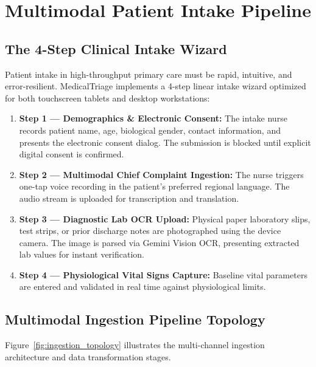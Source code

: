 \documentclass[11pt,a4paper,oneside]{report}
\begin{document}
\chapter{Multimodal Patient Intake Pipeline}

\section{The 4-Step Clinical Intake Wizard}
Patient intake in high-throughput primary care must be rapid, intuitive, and error-resilient. MedicalTriage implements a 4-step linear intake wizard optimized for both touchscreen tablets and desktop workstations:
\begin{enumerate}[leftmargin=20pt]
  \item \textbf{Step 1 --- Demographics \& Electronic Consent:} The intake nurse records patient name, age, biological gender, contact information, and presents the electronic consent dialog. The submission is blocked until explicit digital consent is confirmed.
  \item \textbf{Step 2 --- Multimodal Chief Complaint Ingestion:} The nurse triggers one-tap voice recording in the patient's preferred regional language. The audio stream is uploaded for transcription and translation.
  \item \textbf{Step 3 --- Diagnostic Lab OCR Upload:} Physical paper laboratory slips, test strips, or prior discharge notes are photographed using the device camera. The image is parsed via Gemini Vision OCR, presenting extracted lab values for instant verification.
  \item \textbf{Step 4 --- Physiological Vital Signs Capture:} Baseline vital parameters are entered and validated in real time against physiological limits.
\end{enumerate}

\section{Multimodal Ingestion Pipeline Topology}
Figure~\ref{fig:ingestion_topology} illustrates the multi-channel ingestion architecture and data transformation stages.
\end{document}
